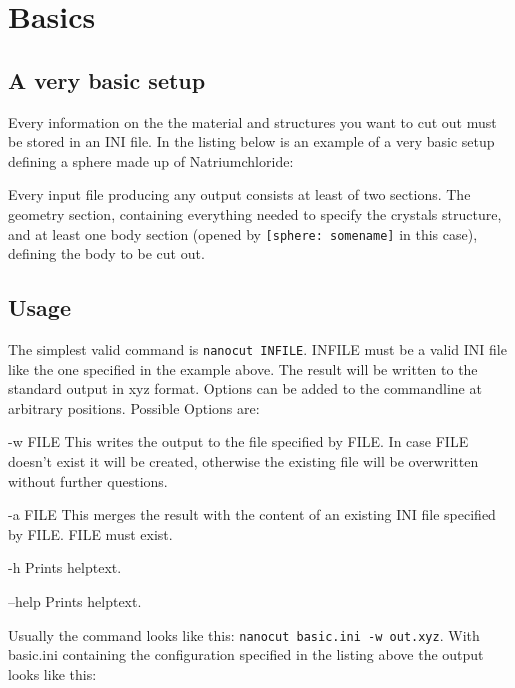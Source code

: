 \section{Basics}
\subsection{A very basic setup}

Every information on the the material and structures you want to cut out must be stored in an INI file. In the listing below is an example of a very basic setup defining a sphere made up of Natriumchloride:

Every input file producing any output consists at least of two sections. The geometry section, containing everything needed to specify the crystals structure, and at least one body section (opened by \lstinline{[sphere: somename]} in this case), defining the body to be cut out.

\subsection{Usage}

The simplest valid command is \lstinline{nanocut INFILE}. INFILE must be a valid INI file like the one specified in the example above. The result will be written to the standard output in xyz format. Options can be added to the commandline at arbitrary positions. Possible Options are:
\begin{description}
 \item{-w FILE} This writes the output to the file specified by FILE. In case FILE doesn't exist it will be created, otherwise the existing file will be overwritten without further questions.
 \item{-a FILE} This merges the result with the content of an existing INI file specified by FILE. FILE must exist.
 \item{-h} Prints helptext.
 \item{--help} Prints helptext.
\end{description}
Usually the command looks like this: \lstinline{nanocut basic.ini -w out.xyz}. With basic.ini containing the configuration specified in the listing above the output looks like this:
